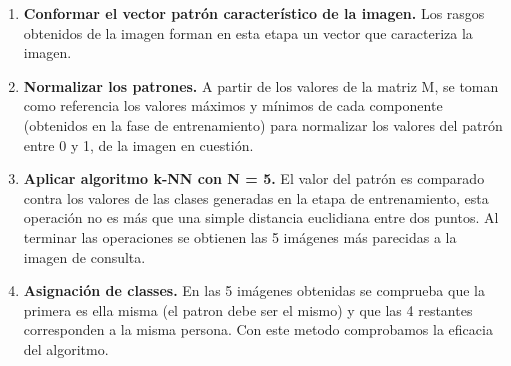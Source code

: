 \begin{enumerate}
\begin{enumerate}
	\end{enumerate}
	\item \textbf{Conformar el vector patr\'on caracter\'istico de la imagen.} Los rasgos obtenidos de la imagen forman en esta etapa un vector que caracteriza la imagen.	
	\item \textbf{Normalizar los patrones.} A partir de los valores de la matriz M, se toman como referencia los valores m\'aximos y m\'inimos de cada componente (obtenidos en la fase de entrenamiento) para normalizar los valores del patr\'on entre 0 y 1, de la imagen en cuesti\'on.
	\item \textbf{Aplicar algoritmo k-NN con N = 5.} El valor del patr\'on es comparado contra los valores de las clases generadas en la etapa de entrenamiento, esta operaci\'on no es m\'as que una simple distancia euclidiana entre dos puntos. Al terminar las operaciones se obtienen las 5 im\'agenes m\'as parecidas a la imagen de consulta.
	\item \textbf{Asignaci\'on de classes.} En las 5 im\'agenes obtenidas se comprueba que la primera es ella misma (el patron debe ser el mismo) y que las 4 restantes corresponden a la misma persona. Con este metodo comprobamos la eficacia del algoritmo.
\end{enumerate}



















